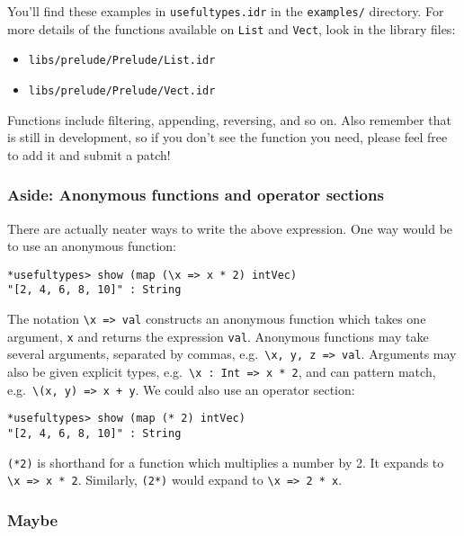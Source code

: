 \noindent
You'll find these examples in \texttt{usefultypes.idr} in the \texttt{examples/} directory.
For more details of the functions available on \texttt{List} and \texttt{Vect}, look in the library files:

\begin{itemize}
\item\texttt{libs/prelude/Prelude/List.idr}
\item\texttt{libs/prelude/Prelude/Vect.idr}
\end{itemize}

\noindent
Functions include filtering, appending, reversing, and so on.
Also remember that \Idris{} is still in development, so if you don't see the function you need, please feel free to add it and submit a patch!

\subsubsection*{Aside: Anonymous functions and operator sections}

There are actually neater ways to write the above expression.
One way would be to use an anonymous function:

\begin{lstlisting}[style=stdout]
*usefultypes> show (map (\x => x * 2) intVec)
"[2, 4, 6, 8, 10]" : String
\end{lstlisting}


\noindent
The notation \lstinline!\x => val! constructs an anonymous function which takes one argument, \texttt{x} and returns the expression \texttt{val}.
Anonymous functions may take several arguments, separated by commas, e.g.\ \lstinline!\x, y, z => val!.
Arguments may also be given explicit types, e.g.\ \lstinline!\x : Int => x * 2!, and can pattern match, e.g.\ \lstinline!\(x, y) => x + y!.
We could also use an operator section:

\begin{lstlisting}[style=stdout]
*usefultypes> show (map (* 2) intVec)
"[2, 4, 6, 8, 10]" : String
\end{lstlisting}


\noindent
\lstinline!(*2)! is shorthand for a function which multiplies a number by 2.
It expands to \lstinline!\x => x * 2!.
Similarly, \texttt{(2*)} would expand to \lstinline!\x => 2 * x!.

\subsubsection{Maybe}

